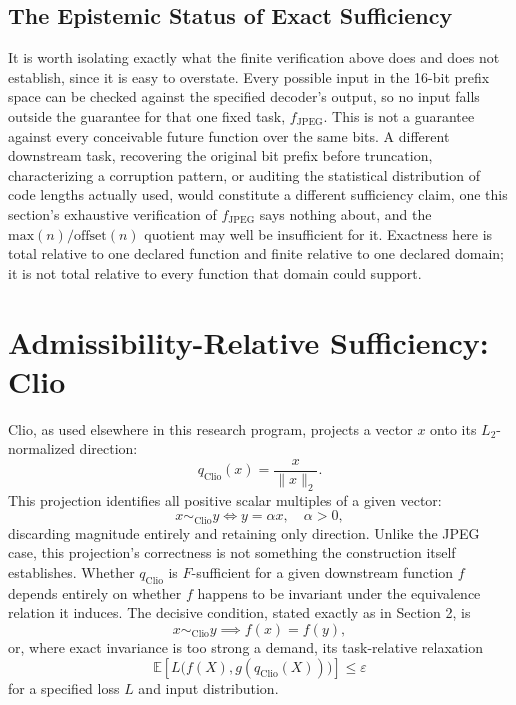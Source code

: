 \documentclass[11pt]{article}
\begin{document}
\subsection{The Epistemic Status of Exact Sufficiency}

It is worth isolating exactly what the finite verification above does and does not establish, since it is easy to overstate. Every possible input in the 16-bit prefix space can be checked against the specified decoder's output, so no input falls outside the guarantee for that one fixed task, $f_{\mathrm{JPEG}}$. This is not a guarantee against every conceivable future function over the same bits. A different downstream task, recovering the original bit prefix before truncation, characterizing a corruption pattern, or auditing the statistical distribution of code lengths actually used, would constitute a different sufficiency claim, one this section's exhaustive verification of $f_{\mathrm{JPEG}}$ says nothing about, and the $\mathrm{max}(n)/\mathrm{offset}(n)$ quotient may well be insufficient for it. Exactness here is total relative to one declared function and finite relative to one declared domain; it is not total relative to every function that domain could support.

\section{Admissibility-Relative Sufficiency: Clio}

Clio, as used elsewhere in this research program, projects a vector $x$ onto its $L_2$-normalized direction:
\[
q_{\mathrm{Clio}}(x) = \frac{x}{\lVert x \rVert_2}.
\]
This projection identifies all positive scalar multiples of a given vector:
\[
x \sim_{\mathrm{Clio}} y \iff y = \alpha x, \quad \alpha > 0,
\]
discarding magnitude entirely and retaining only direction. Unlike the JPEG case, this projection's correctness is not something the construction itself establishes. Whether $q_{\mathrm{Clio}}$ is $F$-sufficient for a given downstream function $f$ depends entirely on whether $f$ happens to be invariant under the equivalence relation it induces. The decisive condition, stated exactly as in Section 2, is
\[
x \sim_{\mathrm{Clio}} y \implies f(x) = f(y),
\]
or, where exact invariance is too strong a demand, its task-relative relaxation
\[
\mathbb{E}\left[ L\bigl(f(X), g(q_{\mathrm{Clio}}(X))\bigr) \right] \leq \varepsilon
\]
for a specified loss $L$ and input distribution.
\end{document}
